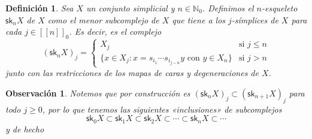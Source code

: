 \documentclass[11pt]{report}
\theoremstyle{colored}
\newtheorem{definition}{Definición}[section]
\newtheorem{remark}{Observación}[section]
\newcommand{\N}{\mathbb{N}}
\newcommand{\nat}[1]{[\![#1]\!]}
\newcommand{\natzero}[1]{\nat{#1}_0}
\newcommand{\sk}{\mathsf{sk}}
\newcommand{\guill}[1]{«#1»}
\begin{document}
\begin{definition} Sea $X$ un conjunto simplicial y $n \in \N_0$. Definimos el $n$-esqueleto $\sk_n X$ de $X$ como el menor subcomplejo de $X$ que tiene a los $j$-símplices de $X$ para cada $j \in \natzero{n}$. Es decir, es el complejo
\[
(\sk_nX)_j = \begin{cases}
X_j &\text{si $j \leq n$}\\
\{x \in X_j : x = s_{i_1} \cdots s_{i_{j-n}}y \text{ con } y \in X_n\} &\text{si $j > n$}
\end{cases}
\]
junto con las restricciones de los mapas de caras y degeneraciones de $X$. 
\end{definition}
\begin{remark}Notemos que por construcción es $(\sk_n X)_j \subset (\sk_{n+1} X)_j$ para todo $j \geq 0$, por lo que tenemos las siguientes \guill{inclusiones} de subcomplejos
\[
\sk_0X \subset \sk_1X \subset \sk_2X \subset \cdots \subset \sk_nX \subset \cdots
\]
y de hecho
\end{remark}
\end{document}
